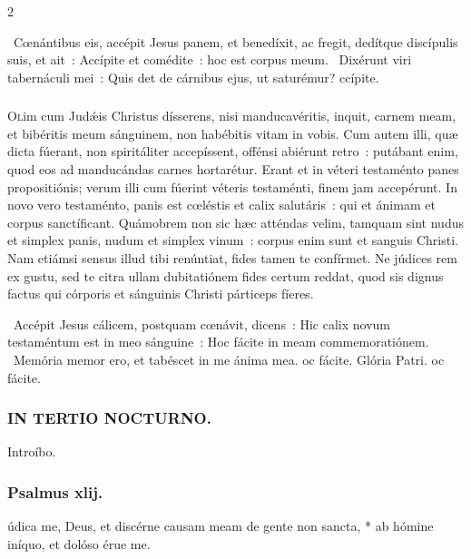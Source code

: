 \documentclass[9pt,twoside]{extarticle}
\begin{document}
\begin{multicols}{2}
\begin{tightlist}{}
\item {}~Cœnántibus eis, accépit Jesus panem, et benedíxit, ac fregit, dedítque discípulis suis, et ait~: \textred{*} Accípite et comédite~: hoc est corpus meum. ~Dixérunt viri tabernáculi mei~: Quis det de cárnibus ejus, ut saturémur? ccípite.
\end{tightlist}

\subsubsection*{\center {}}
\lettrine{O}lim cum Judǽis Christus dísserens, nisi manducavéritis, inquit, carnem meam, et bibéritis meum sánguinem, non habébitis vitam in vobis. Cum autem illi, quæ dicta fúerant, non spiritáliter accepíssent, offénsi abiérunt retro~: putábant enim, quod eos ad manducándas carnes hortarétur. Erant et in véteri testaménto panes propositiónis; verum illi cum fúerint véteris testaménti, finem jam accepérunt. In novo vero testaménto, panis est cœléstis et calix salutáris~: qui et ánimam et corpus sanctíficant. Quámobrem non sic hæc atténdas velim, tamquam sint nudus et simplex panis, nudum et simplex vinum~: corpus enim sunt et sanguis Christi. Nam etiámsi sensus illud tibi renúntiat, fides tamen te confírmet. Ne júdices rem ex gustu, sed te citra ullam dubitatiónem fides certum reddat, quod sis dignus factus qui córporis et sánguinis Christi párticeps fíeres.

\begin{tightlist}{}
\item {}~Accépit Jesus cálicem, postquam cœnávit, dicens~: Hic calix novum testaméntum est in meo sánguine~: \textred{*} Hoc fácite in meam commemoratiónem. ~Memória memor ero, et tabéscet in me ánima mea. oc fácite. Glória Patri. oc fácite.
\end{tightlist}

\subsubsection*{\center \textsc{IN TERTIO NOCTURNO.}}
\begin{tightlist}{}
\item {} Introíbo.
\end{tightlist}
\subsubsection*{\center Psalmus xlij.}
údica me, Deus, et discérne causam meam de gente non sancta, * ab hómine iníquo, et dolóso érue me.


\end{multicols}
\end{document}

